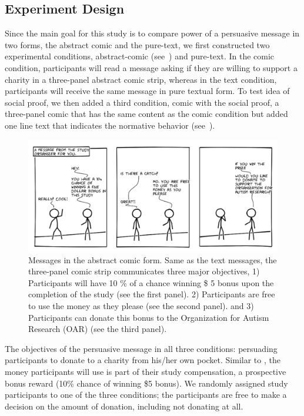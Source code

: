 \subsection{Experiment Design}
Since the main goal for this study is to compare power of a persuasive message in two forms, the abstract comic and the pure-text, we first constructed two experimental conditions, abstract-comic (see~) and pure-text. In the comic condition, participants will read a message asking if they are willing to support a charity in a three-panel abstract comic strip, whereas in the text condition, participants will receive the same message in pure textual form. To test idea of social proof, we then added a third condition, comic with the social proof, a three-panel comic that has the same content as the comic condition but added one line text that indicates the normative behavior (see~).

\begin{figure}[bt]
	\centering
	\includegraphics[width=\columnwidth]{./figures/abstract_comic.png}
	\caption{Messages in the abstract comic form. Same as the text messages, the three-panel comic strip communicates three major objectives, 1) Participants will have 10 \% of a chance winning \$ 5 bonus upon the completion of the study (see the first panel). 2) Participants are free to use the money as they please (see the second panel). and 3) Participants can donate this bonus to the Organization for Autism Research (OAR) (see the third panel).}
	\label{fig:basic three comic panel}
\end{figure}

The objectives of the persuasive message in all three conditions: persuading participants to donate to a charity from his/her own pocket. Similar to \textcite{lee2013does}, the money participants will use is part of their study compensation, a prospective bonus reward (10\% chance of winning \$5 bonus). We randomly assigned study participants to one of the three conditions; the participants are free to make a decision on the amount of donation, including not donating at all.

